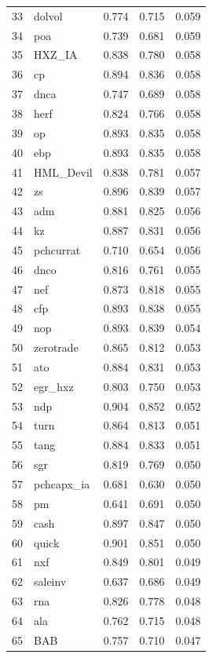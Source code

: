 \begin{footnotesize}
\begin{longtable}{rl|c|c|c}
		33 & dolvol & 0.774 & 0.715 & 0.059 \\ 
		34 & poa & 0.739 & 0.681 & 0.059 \\ 
		35 & HXZ\_IA & 0.838 & 0.780 & 0.058 \\ 
		36 & cp & 0.894 & 0.836 & 0.058 \\ 
		37 & dnca & 0.747 & 0.689 & 0.058 \\ 
		38 & herf & 0.824 & 0.766 & 0.058 \\ 
		39 & op & 0.893 & 0.835 & 0.058 \\ 
		40 & ebp & 0.893 & 0.835 & 0.058 \\ 
		41 & HML\_Devil & 0.838 & 0.781 & 0.057 \\ 
		42 & zs & 0.896 & 0.839 & 0.057 \\ 
		43 & adm & 0.881 & 0.825 & 0.056 \\ 
		44 & kz & 0.887 & 0.831 & 0.056 \\ 
		45 & pchcurrat & 0.710 & 0.654 & 0.056 \\ 
		46 & dnco & 0.816 & 0.761 & 0.055 \\ 
		47 & nef & 0.873 & 0.818 & 0.055 \\ 
		48 & cfp & 0.893 & 0.838 & 0.055 \\ 
		49 & nop & 0.893 & 0.839 & 0.054 \\ 
		50 & zerotrade & 0.865 & 0.812 & 0.053 \\ 
		51 & ato & 0.884 & 0.831 & 0.053 \\ 
		52 & egr\_hxz & 0.803 & 0.750 & 0.053 \\ 
		53 & ndp & 0.904 & 0.852 & 0.052 \\ 
		54 & turn & 0.864 & 0.813 & 0.051 \\ 
		55 & tang & 0.884 & 0.833 & 0.051 \\ 
		56 & sgr & 0.819 & 0.769 & 0.050 \\ 
		57 & pchcapx\_ia & 0.681 & 0.630 & 0.050 \\ 
		58 & pm & 0.641 & 0.691 & 0.050 \\ 
		59 & cash & 0.897 & 0.847 & 0.050 \\ 
		60 & quick & 0.901 & 0.851 & 0.050 \\ 
		61 & nxf & 0.849 & 0.801 & 0.049 \\ 
		62 & saleinv & 0.637 & 0.686 & 0.049 \\ 
		63 & rna & 0.826 & 0.778 & 0.048 \\ 
		64 & ala & 0.762 & 0.715 & 0.048 \\ 
		65 & BAB & 0.757 & 0.710 & 0.047 \\ 

\end{longtable}
\end{footnotesize}
